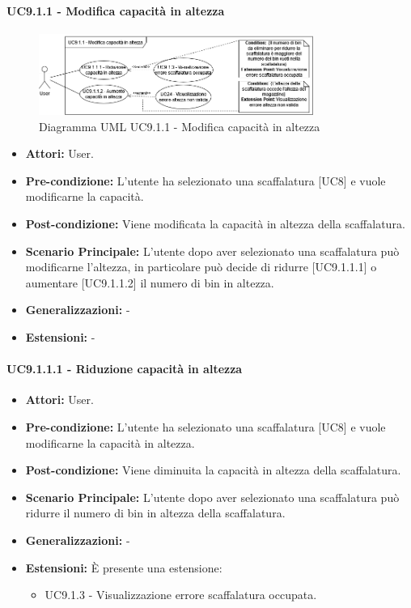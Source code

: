 \paragraph{UC9.1.1 - Modifica capacità in altezza}
\begin{figure}[H]
  \centering
  \includegraphics[width=0.8\textwidth]{UC_diagrams_1-10/UC9.1.1.drawio.png}
   \caption{Diagramma UML UC9.1.1 - Modifica capacità in altezza}
\end{figure}
\begin{itemize}
    \item \textbf{Attori:} User.
    \item \textbf{Pre-condizione:} L'utente ha selezionato una scaffalatura [UC8] e vuole modificarne la capacità.
    \item \textbf{Post-condizione:} Viene modificata la capacità in altezza della scaffalatura.
    \item \textbf{Scenario Principale:} L'utente dopo aver selezionato una scaffalatura può modificarne l'altezza, in particolare può decide di ridurre [UC9.1.1.1] o aumentare [UC9.1.1.2] il numero di bin in altezza.
    \item \textbf{Generalizzazioni:} -
    \item \textbf{Estensioni:} -
\end{itemize}


\paragraph{UC9.1.1.1 - Riduzione capacità in altezza}
\begin{itemize}
    \item \textbf{Attori:} User.
    \item \textbf{Pre-condizione:} L'utente ha selezionato una scaffalatura [UC8] e vuole modificarne la capacità in altezza.
    \item \textbf{Post-condizione:} Viene diminuita la capacità in altezza della scaffalatura.
    \item \textbf{Scenario Principale:} L'utente dopo aver selezionato una scaffalatura può ridurre il numero di bin in altezza della scaffalatura.
    \item \textbf{Generalizzazioni:} -
    \item \textbf{Estensioni:} È presente una estensione:
    \begin{itemize}
        \item UC9.1.3 - Visualizzazione errore scaffalatura occupata.
    \end{itemize}
\end{itemize}



